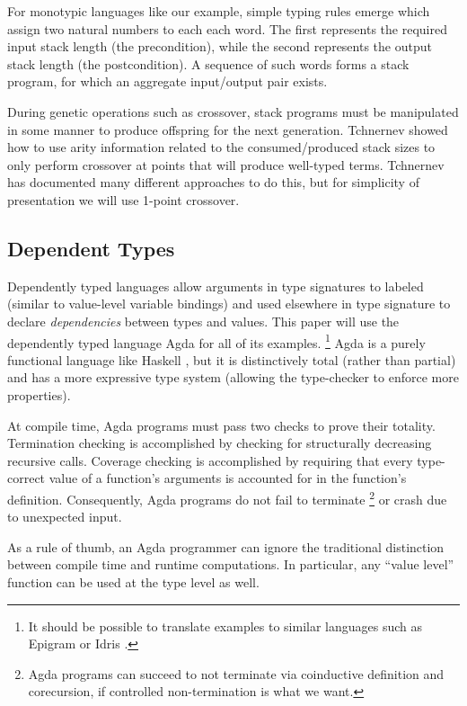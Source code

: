 \documentclass[runningheads,a4paper]{llncs}
\begin{document}
For monotypic languages like our example, simple typing rules
emerge which assign two natural numbers to each each word. The first represents the
required input stack length (the precondition), while the second represents
the output stack length (the postcondition). A sequence of such words forms a stack
program, for which an aggregate input/output pair exists.

During genetic operations such as crossover, stack programs must be
manipulated in some manner to produce offspring for the next
generation. Tchnernev \cite{tchernev:forthcross} showed how to use arity
information related to the consumed/produced stack sizes to only
perform crossover at points that will produce well-typed
terms. Tchnernev \cite{tchernev:crossmethods} has documented many different
approaches to do this, but for simplicity of presentation we will use
1-point crossover.

\subsection{Dependent Types}

Dependently typed languages allow arguments in type signatures to
labeled (similar to value-level variable bindings) and used elsewhere in type signature to declare
\textit{dependencies} between types and values. This paper will use the
dependently typed language Agda \cite{norell:agdatut} for
all of its examples. \footnote{It should be possible to translate examples
to similar languages such as Epigram \cite{mcbride:epigram} or
Idris \cite{brady:idris}.} Agda is a purely functional language like
Haskell \cite{spj:haskell}, but it is distinctively total (rather than
partial) and has a more expressive type system (allowing the
type-checker to enforce more properties).

At compile time, Agda programs must pass two checks to prove their
totality. Termination checking is accomplished by checking
for structurally decreasing recursive calls. Coverage checking is
accomplished by requiring that every type-correct value of a function's
arguments is accounted for in the function's definition.
Consequently, Agda programs do not fail to terminate
\footnote{Agda programs can succeed to not terminate via
  coinductive definition and corecursion, if controlled
  non-termination is what we want.}
or crash due to unexpected input.

As a rule of thumb, an Agda programmer can ignore the traditional
distinction between compile time and runtime computations. In
particular, any ``value level'' function can be used at the type level
as well.
\end{document}
